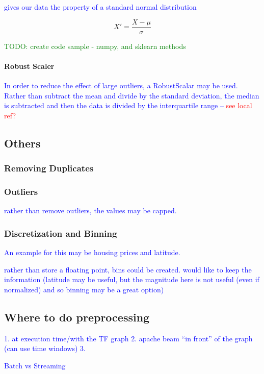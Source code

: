 \textcolor{blue}{gives our data the property of a standard normal distribution}

\begin{equation}
{X' = \frac{X - \mu}{\sigma}}
\label{eq:preprocess_standardization}
\end{equation}

\textcolor{green}{TODO: create code sample - numpy, and sklearn methods}

\paragraph{Robust Scaler}

\textcolor{blue}{In order to reduce the effect of large outliers, a \textcolor{blue}{RobustScalar} may be used. Rather than subtract the mean and divide by the standard deviation, the median is subtracted and then the data is divided by the {interquartile range} -- \textcolor{red}{see local ref?}}


\subsection{Others}

\subsubsection{Removing Duplicates}

\subsubsection{Outliers}

\textcolor{blue}{rather than remove outliers, the values may be capped.}

\subsubsection{Discretization and Binning}

\textcolor{blue}{An example for this may be housing prices and latitude.}



\textcolor{blue}{rather than store a floating point, bins could be created. would like to keep the information (latitude may be useful, but the magnitude here is not useful (even if normalized) and so binning may be a great option)}


\subsection{Where to do preprocessing}

\textcolor{blue}{1. at execution time/with the TF graph}
\textcolor{blue}{2. apache beam ``in front'' of the graph (can use time windows)}
\textcolor{blue}{3. }



\textcolor{blue}{Batch vs Streaming}

